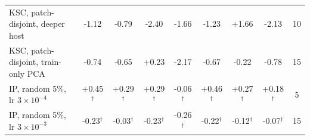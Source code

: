 \begin{tabular}{lcccccccc}
KSC, patch-disjoint, deeper host & -1.12 & -0.79 & -2.40 & -1.66 & -1.23 & +1.66 & -2.13 & 10 \\
KSC, patch-disjoint, train-only PCA & -0.74 & -0.65 & +0.23 & -2.17 & -0.67 & -0.22 & -0.78 & 15 \\
IP, random 5\%, lr $3\times10^{-4}$ & +0.45$^{\dagger}$ & +0.29$^{\dagger}$ & +0.29$^{\dagger}$ & -0.06$^{\dagger}$ & +0.46$^{\dagger}$ & +0.27$^{\dagger}$ & +0.18$^{\dagger}$ & 5 \\
IP, random 5\%, lr $3\times10^{-3}$ & -0.23$^{\dagger}$ & -0.03$^{\dagger}$ & -0.23$^{\dagger}$ & -0.26$^{\dagger}$ & -0.22$^{\dagger}$ & -0.12$^{\dagger}$ & -0.07$^{\dagger}$ & 15 \\
\bottomrule
\end{tabular}
